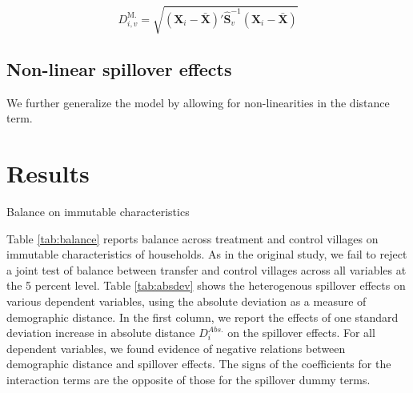 \documentclass[11pt]{article}
\begin{document}
            \begin{equation} \label{eq:mdist}
            D^\text{M.}_{i,v} = \sqrt{(\mathbf X_i - \mathbf{\bar X})' \mathbf{\hat S}^{-1}_v (\mathbf X_i - \mathbf{\bar X})}
            \end{equation}

    \subsection{Non-linear spillover effects}

        We further generalize the model by allowing for non-linearities in the distance term.

\section{Results}

    \begin{table}[H]
    \centering
    \caption{Balance on immutable characteristics}
    \label{tab:balance}
    \end{table}

    Table \ref{tab:balance} reports balance across treatment and control villages on immutable characteristics of households. As in the original study, we fail to reject a joint test of balance between transfer and control villages across all variables at the 5 percent level. Table \ref{tab:absdev} shows the heterogenous spillover effects on various dependent variables, using the absolute deviation as a measure of demographic distance. In the first column, we report the effects of one standard deviation increase in absolute distance  $D_i^{Abs.}$ on the spillover effects. For all dependent variables, we found evidence of negative relations between demographic distance and spillover effects. The signs of the coefficients for the interaction terms are the opposite of those for the spillover dummy terms. \\
\end{document}
